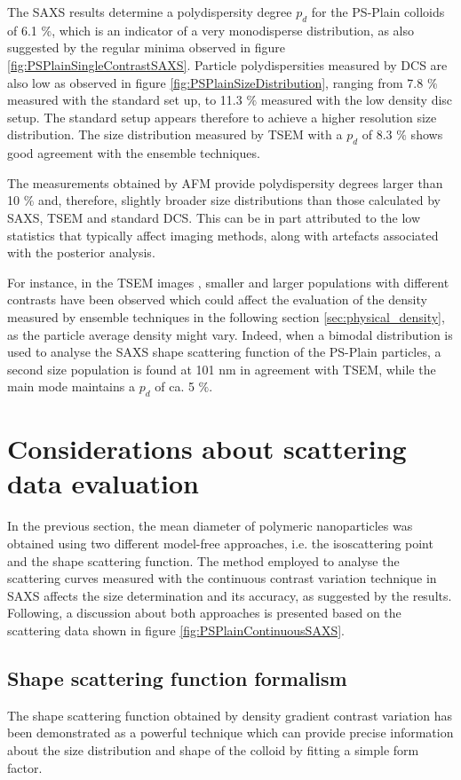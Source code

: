 The SAXS results determine a polydispersity degree $p_d$ for the PS-Plain colloids of 6.1 $\%$, which is an indicator of a very monodisperse distribution, as also suggested by the regular minima observed in figure \ref{fig:PSPlainSingleContrastSAXS}. Particle polydispersities measured by DCS are also low as observed in figure \ref{fig:PSPlainSizeDistribution}, ranging from 7.8 $\%$ measured with the standard set up, to 11.3 $\%$ measured with the low density disc setup. The standard setup appears therefore to achieve a higher resolution size distribution. The size distribution measured by TSEM with a $p_d$ of 8.3 $\%$ shows good agreement with the ensemble techniques.

The measurements obtained by AFM provide polydispersity degrees larger than 10 $\%$ \citep{nicolet_inter-laboratory_2016} and, therefore, slightly broader size distributions than those calculated by SAXS, TSEM and standard DCS. This can be in part attributed to the low statistics that typically affect imaging methods, along with artefacts associated with the posterior analysis.

For instance, in the TSEM images \citep{nicolet_inter-laboratory_2016}, smaller and larger populations with different contrasts have been observed which could affect the evaluation of the density measured by ensemble techniques in the following section \ref{sec:physical_density}, as the particle average density might vary. Indeed, when a bimodal distribution is used to analyse the SAXS shape scattering function of the PS-Plain particles, a second size population is found at 101 nm in agreement with TSEM, while the main mode maintains a $p_d$ of ca. 5 $\%$.

\section{Considerations about scattering data evaluation}

In the previous section, the mean diameter of polymeric nanoparticles was obtained using two different model-free approaches, i.e. the isoscattering point and the shape scattering function. The method employed to analyse the scattering curves measured with the continuous contrast variation technique in SAXS affects the size determination and its accuracy, as suggested by the results. Following, a discussion about both approaches is presented based on the scattering data shown in figure \ref{fig:PSPlainContinuousSAXS}.

\subsection{Shape scattering function formalism}
The shape scattering function obtained by density gradient contrast variation has been demonstrated as a powerful technique which can provide precise information about the size distribution and shape of the colloid by fitting a simple form factor.

